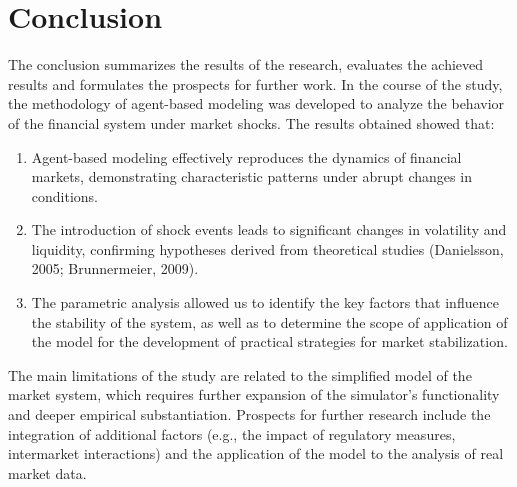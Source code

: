 \section{Conclusion}
The conclusion summarizes the results of the research, evaluates the achieved results and formulates the prospects for further work. In the course of the study, the methodology of agent-based modeling was developed to analyze the behavior of the financial system under market shocks. The results obtained showed that:

\begin{enumerate}
    \item Agent-based modeling effectively reproduces the dynamics of financial markets, demonstrating characteristic patterns under abrupt changes in conditions.
    \item The introduction of shock events leads to significant changes in volatility and liquidity, confirming hypotheses derived from theoretical studies (Danielsson, 2005; Brunnermeier, 2009).
    \item The parametric analysis allowed us to identify the key factors that influence the stability of the system, as well as to determine the scope of application of the model for the development of practical strategies for market stabilization.
\end{enumerate}

The main limitations of the study are related to the simplified model of the market system, which requires further expansion of the simulator's functionality and deeper empirical substantiation. Prospects for further research include the integration of additional factors (e.g., the impact of regulatory measures, intermarket interactions) and the application of the model to the analysis of real market data.